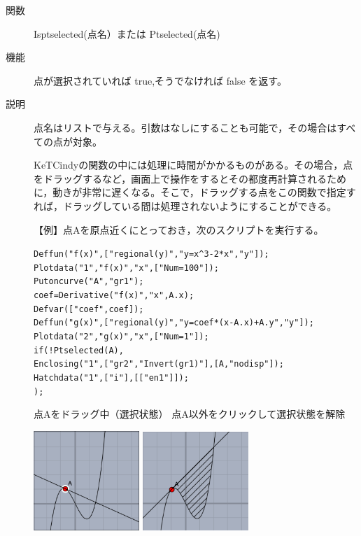\documentclass[papersize,a4paper,10pt,uplatex]{jsarticle}
\begin{document}
\begin{description}
\vspace{\baselineskip}

\hypertarget{isptselected}{}
\item[関数]Isptselected(点名）または Ptselected(点名)
\item[機能]点が選択されていれば true,そうでなければ false を返す。
\item[説明]点名はリストで与える。引数はなしにすることも可能で，その場合はすべての点が対象。

KeTCindyの関数の中には処理に時間がかかるものがある。その場合，点をドラッグするなど，画面上で操作をするとその都度再計算されるために，動きが非常に遅くなる。そこで，ドラッグする点をこの関数で指定すれば，ドラッグしている間は処理されないようにすることができる。

\vspace{\baselineskip}
【例】点Aを原点近くにとっておき，次のスクリプトを実行する。

\verb|Deffun("f(x)",["regional(y)","y=x^3-2*x","y"]);|\\
\verb|Plotdata("1","f(x)","x",["Num=100"]);|\\
\verb|Putoncurve("A","gr1");|\\
\verb|coef=Derivative("f(x)","x",A.x);|\\
\verb|Defvar(["coef",coef]);|\\
\verb|Deffun("g(x)",["regional(y)","y=coef*(x-A.x)+A.y","y"]);|\\
\verb|Plotdata("2","g(x)","x",["Num=1"]);|\\
\verb|if(!Ptselected(A),|\\
\verb|Enclosing("1",["gr2","Invert(gr1)"],[A,"nodisp"]);|\\
\verb|Hatchdata("1",["i"],[["en1"]]);|\\
\verb|);|

\vspace{\baselineskip}
\hspace{5mm} 点Aをドラッグ中（選択状態）\hspace{5mm} 点A以外をクリックして選択状態を解除

\hspace{10mm}\includegraphics[bb=0.00 0.00 218.01 204.51,width=40mm]{Fig/ptselected01.pdf} 
\hspace{10mm}\includegraphics[bb=0.00 0.00 219.01 204.51,width=40mm]{Fig/ptselected02.pdf} 


\end{description}
\end{document}
